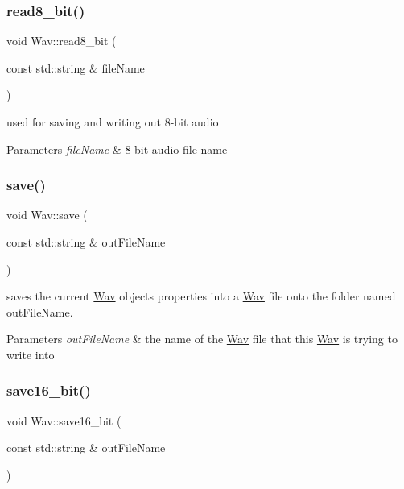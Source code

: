 \subsubsection{\texorpdfstring{read8\+\_\+bit()}{read8\_bit()}}
{\footnotesize\ttfamily void Wav\+::read8\+\_\+bit (\begin{DoxyParamCaption}\item[{const std\+::string \&}]{file\+Name }\end{DoxyParamCaption})}

used for saving and writing out 8-\/bit audio 
\begin{DoxyParams}{Parameters}
{\em file\+Name} & 8-\/bit audio file name \\
\hline
\end{DoxyParams}
\mbox{\label{classWav_a91ed648e0578a907df2f3363d069a4bd}} 
\subsubsection{\texorpdfstring{save()}{save()}}
{\footnotesize\ttfamily void Wav\+::save (\begin{DoxyParamCaption}\item[{const std\+::string \&}]{out\+File\+Name }\end{DoxyParamCaption})}

saves the current \hyperlink{classWav}{Wav} object\textquotesingle{}s properties into a \hyperlink{classWav}{Wav} file onto the folder named out\+File\+Name. 
\begin{DoxyParams}{Parameters}
{\em out\+File\+Name} & the name of the \hyperlink{classWav}{Wav} file that this \hyperlink{classWav}{Wav} is trying to write into \\
\hline
\end{DoxyParams}
\mbox{\label{classWav_a5ebabfc8d61edabf31787fbcf2f7f8ad}} 
\subsubsection{\texorpdfstring{save16\+\_\+bit()}{save16\_bit()}}
{\footnotesize\ttfamily void Wav\+::save16\+\_\+bit (\begin{DoxyParamCaption}\item[{const std\+::string \&}]{out\+File\+Name }\end{DoxyParamCaption})}


